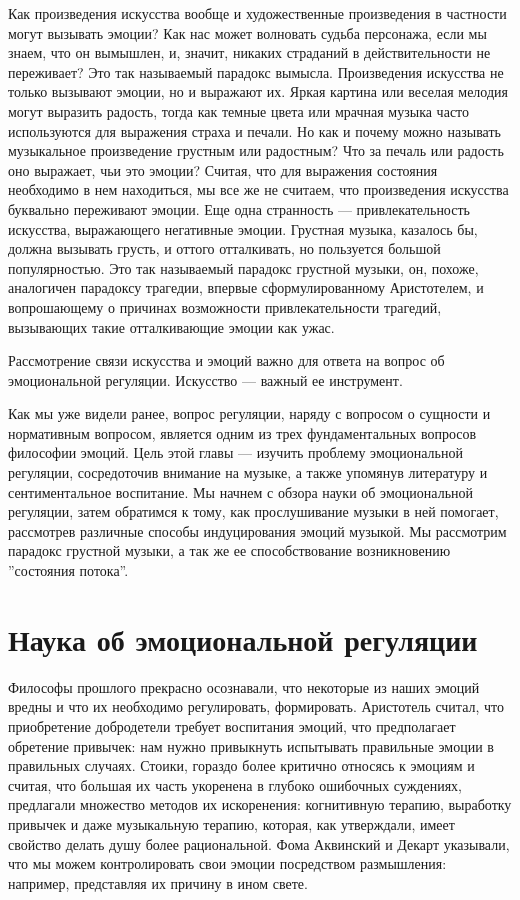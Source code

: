 \documentclass[11pt]{book}
\begin{document}
Как произведения искусства вообще и художественные произведения в частности могут вызывать эмоции? Как нас может волновать судьба персонажа, если мы знаем, что он вымышлен, и, значит, никаких страданий в действительности не переживает? Это так называемый парадокс вымысла. Произведения искусства не только вызывают эмоции, но и выражают их. Яркая картина или веселая мелодия могут выразить радость, тогда как темные цвета или мрачная музыка часто используются для выражения страха и печали. Но как и почему можно называть музыкальное произведение грустным или радостным? Что за печаль или радость оно выражает, чьи это эмоции? Считая, что для выражения состояния необходимо в нем находиться, мы все же не считаем, что произведения искусства буквально переживают эмоции. Еще одна странность --- привлекательность искусства, выражающего негативные эмоции. Грустная музыка, казалось бы, должна вызывать грусть, и оттого отталкивать, но пользуется большой популярностью. Это так называемый парадокс грустной музыки, он, похоже, аналогичен парадоксу трагедии, впервые сформулированному Аристотелем, и вопрошающему о причинах возможности привлекательности трагедий, вызывающих такие отталкивающие эмоции как ужас.

Рассмотрение связи искусства и эмоций важно для ответа на вопрос об эмоциональной регуляции. Искусство --- важный ее инструмент.

Как мы уже видели ранее, вопрос регуляции, наряду с вопросом о сущности и нормативным вопросом, является одним из трех фундаментальных вопросов философии эмоций. Цель этой главы --- изучить проблему эмоциональной регуляции, сосредоточив внимание на музыке, а также упомянув литературу и сентиментальное воспитание. Мы начнем с обзора науки об эмоциональной регуляции, затем обратимся к тому, как прослушивание музыки в ней помогает, рассмотрев различные способы индуцирования эмоций музыкой. Мы рассмотрим парадокс грустной музыки, а так же ее способствование возникновению ''состояния потока''.

\section{Наука об эмоциональной регуляции}

Философы прошлого прекрасно осознавали, что некоторые из наших эмоций вредны и что их необходимо регулировать, формировать. Аристотель считал, что приобретение добродетели требует воспитания эмоций, что предполагает обретение привычек: нам нужно привыкнуть испытывать правильные эмоции в правильных случаях. Стоики, гораздо более критично относясь к эмоциям и считая, что большая их часть укоренена в глубоко ошибочных суждениях, предлагали множество методов их искоренения: когнитивную терапию, выработку привычек и даже музыкальную терапию, которая, как утверждали, имеет свойство делать душу более рациональной. Фома Аквинский и Декарт указывали, что мы можем контролировать свои эмоции посредством размышления: например, представляя их причину в ином свете.
\end{document}
